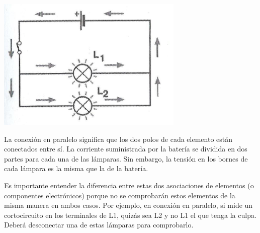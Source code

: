 \documentclass[a5paper,twoside,openany]{book}
\begin{document}
\begin{itemize}
\noindent\begin{minipage}[t]{0.5\textwidth}\vspace{0pt}
\includegraphics[width=\linewidth]{circuito-paralelo}
\end{minipage}%
\hfill%
\begin{minipage}[t]{0.45\textwidth}\vspace{0pt}
La conexión en paralelo significa que
los dos polos de cada elemento están conectados entre sí.
La corriente suministrada por la batería se
dividida en dos partes para cada una de las lámparas.
Sin embargo, la tensión en los bornes de cada lámpara es la misma que la de la batería.
\end{minipage}
\end{itemize}
Es importante entender la diferencia entre estas dos asociaciones de elementos (o componentes electrónicos) porque no se comprobarán estos elementos de la misma manera en ambos casos.
Por ejemplo, en conexión en paralelo, si mide un cortocircuito en los terminales de L1, quizás sea L2 y no L1 el que tenga la culpa. Deberá desconectar una de estas lámparas para comprobarlo.
\end{document}
